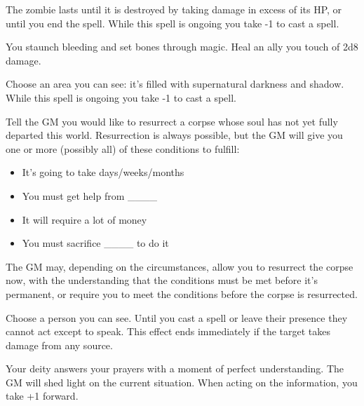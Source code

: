 The zombie lasts until it is destroyed by taking damage in excess of its HP, or until you end the spell. While this spell is ongoing you take -1 to cast a spell.
\newpage
{}


You staunch bleeding and set bones through magic. Heal an ally you touch of 2d8 damage.



Choose an area you can see: it's filled with supernatural darkness and shadow. While this spell is ongoing you take -1 to cast a spell.



Tell the GM you would like to resurrect a corpse whose soul has not yet fully departed this world. Resurrection is always possible, but the GM will give you one or more (possibly all) of these conditions to fulfill:
\begin{itemize}
\item It's going to take days/weeks/months
\item You must get help from \_\_\_\_
\item It will require a lot of money
\item You must sacrifice \_\_\_\_ to do it

\end{itemize}

The GM may, depending on the circumstances, allow you to resurrect the corpse now, with the understanding that the conditions must be met before it's permanent, or require you to meet the conditions before the corpse is resurrected.



Choose a person you can see. Until you cast a spell or leave their presence they cannot act except to speak. This effect ends immediately if the target takes damage from any source.



Your deity answers your prayers with a moment of perfect understanding. The GM will shed light on the current situation. When acting on the information, you take +1 forward.

